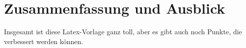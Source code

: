 
\chapter{Zusammenfassung und Ausblick}
\label{sec:Zusammenfassung}

Insgesamt ist diese Latex-Vorlage ganz toll, aber es gibt auch noch Punkte, die verbessert werden können.
